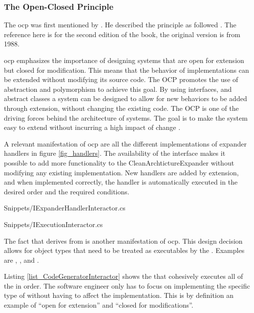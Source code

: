 \subsubsection{The Open-Closed Principle} \label{subsubsec_ocp}

The \gls{ocp} was first mentioned by . He described
the principle as followed \parencite[79]{meyer_object-oriented_1997}. The reference here
is for the second edition of the book, the original version is from 1988.


\gls{ocp} emphasizes the importance of designing systems that are open for extension but
closed for modification. This means that the behavior of implementations can be extended
without modifying its source code. The OCP promotes the use of abstraction and
polymorphism to achieve this goal. By using interfaces, and abstract classes a system can
be designed to allow for new behaviors to be added through extension, without changing the
existing code. The OCP is one of the driving forces	behind the architecture	of systems.
The goal is	to make	the	system easy	to extend without incurring a high impact of change
\parencite[94]{robert_c_martin_clean_2018}.

A relevant manifestation of \gls{ocp} are all the different implementations of expander
handlers in figure \ref{fig_handlers}. The availability of the
 interface makes it possible to add more
functionality to the CleanArchtictureExpander without modifying any existing
implementation. New handlers are added by extension, and when implemented correctly, the
handler is automatically executed in the desired order and the required conditions.


    {Snippets/IExpanderHandlerInteractor.cs}


    {Snippets/IExecutionInteractor.cs}

The fact that  derives from
 is another manifestation of \gls{ocp}. This
design decision allows for object types that need to be treated as executables by the
. Examples are
,
,
 and
. 

Listing \ref{list_CodeGeneratorInteractor} shows the
 that cohesively executes all of the
 in order. The software engineer only has to focus on
implementing the specific type of  without having to
affect the implementation. This is by definition an example of \enquote{open for
extension} and \enquote{closed for modifications}.